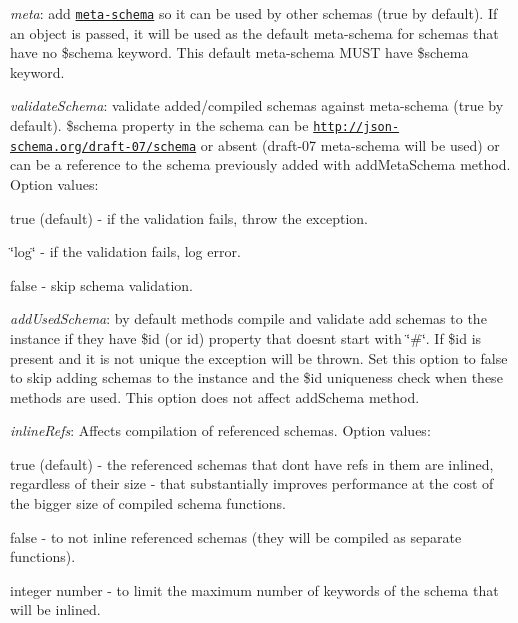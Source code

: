\begin{DoxyItemize}
\item {\itshape meta}\+: add \href{http://json-schema.org/documentation.html}{\tt meta-\/schema} so it can be used by other schemas (true by default). If an object is passed, it will be used as the default meta-\/schema for schemas that have no {\ttfamily \$schema} keyword. This default meta-\/schema M\+U\+ST have {\ttfamily \$schema} keyword.
\item {\itshape validate\+Schema}\+: validate added/compiled schemas against meta-\/schema (true by default). {\ttfamily \$schema} property in the schema can be \href{http://json-schema.org/draft-07/schema}{\tt http\+://json-\/schema.\+org/draft-\/07/schema} or absent (draft-\/07 meta-\/schema will be used) or can be a reference to the schema previously added with {\ttfamily add\+Meta\+Schema} method. Option values\+:
\begin{DoxyItemize}
\item {\ttfamily true} (default) -\/ if the validation fails, throw the exception.
\item {\ttfamily \char`\"{}log\char`\"{}} -\/ if the validation fails, log error.
\item {\ttfamily false} -\/ skip schema validation.
\end{DoxyItemize}
\item {\itshape add\+Used\+Schema}\+: by default methods {\ttfamily compile} and {\ttfamily validate} add schemas to the instance if they have {\ttfamily \$id} (or {\ttfamily id}) property that doesn\textquotesingle{}t start with \char`\"{}\#\char`\"{}. If {\ttfamily \$id} is present and it is not unique the exception will be thrown. Set this option to {\ttfamily false} to skip adding schemas to the instance and the {\ttfamily \$id} uniqueness check when these methods are used. This option does not affect {\ttfamily add\+Schema} method.
\item {\itshape inline\+Refs}\+: Affects compilation of referenced schemas. Option values\+:
\begin{DoxyItemize}
\item {\ttfamily true} (default) -\/ the referenced schemas that don\textquotesingle{}t have refs in them are inlined, regardless of their size -\/ that substantially improves performance at the cost of the bigger size of compiled schema functions.
\item {\ttfamily false} -\/ to not inline referenced schemas (they will be compiled as separate functions).
\item integer number -\/ to limit the maximum number of keywords of the schema that will be inlined.

\end{DoxyItemize}
\end{DoxyItemize}
